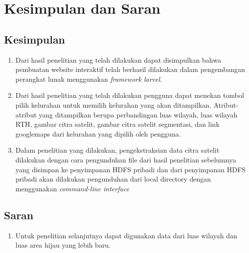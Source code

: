 \chapter{Kesimpulan dan Saran}
\label{chap:kesimpulan-saran}

\section{Kesimpulan}
\label{sec:kesimpulan}
	\begin{enumerate}
		\item Dari hasil penelitian yang telah dilakukan dapat disimpulkan  bahwa pembuatan website interaktif telah berhasil dilakukan dalam pengembangan perangkat lunak menggunakan \textit{framework larvel}.
		
		\item Dari hasil penelitian yang telah dilakukan pengguna dapat menekan tombol pilih kelurahan untuk memilih kelurahan yang akan ditampilkan. Atribut-atribut yang ditampilkan berupa perbandingan luas wilayah, luas wilayah RTH, gambar citra satelit, gambar citra satelit segmentasi, dan link googlemaps dari kelurahan yang dipilih oleh pengguna.
		
		\item Dalam penelitian yang dilakukan, pengekstraksian data citra satelit dilakukan dengan cara pengunduhan file dari hasil penelitian sebelumnya yang disimpan ke penyimpanan HDFS pribadi dan dari penyimpanan HDFS pribadi akan dilakukan pengunduhan dari local directory dengan menggunakan \textit{command-line interface}
		
	\end{enumerate}

\section{Saran}
\label{sec:saran}

\begin{enumerate}
	\item Untuk penelitian selanjutnya dapat digunakan data dari luas wilayah dan luas area hijau yang lebih baru.
\end{enumerate}

